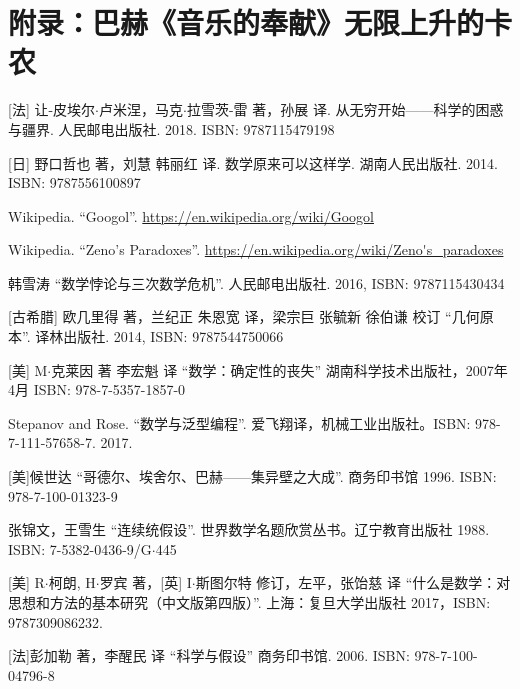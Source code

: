\documentclass{article}
\begin{document}

\section{附录：巴赫《音乐的奉献》无限上升的卡农}



\ifx\wholebook\relax \else
\begin{thebibliography}{99}

[法] 让-皮埃尔$\cdot$卢米涅，马克$\cdot$拉雪茨-雷 著，孙展 译. 从无穷开始——科学的困惑与疆界. 人民邮电出版社. 2018. ISBN: 9787115479198

[日] 野口哲也 著，刘慧 韩丽红 译. 数学原来可以这样学. 湖南人民出版社. 2014. ISBN: 9787556100897

Wikipedia. ``Googol''. \url{https://en.wikipedia.org/wiki/Googol}

Wikipedia. ``Zeno's Paradoxes''. \url{https://en.wikipedia.org/wiki/Zeno's_paradoxes}

韩雪涛 ``数学悖论与三次数学危机''. 人民邮电出版社. 2016, ISBN: 9787115430434

[古希腊] 欧几里得 著，兰纪正 朱恩宽 译，梁宗巨 张毓新 徐伯谦 校订 ``几何原本''. 译林出版社. 2014, ISBN: 9787544750066

[美] M$\cdot$克莱因 著 李宏魁 译 ``数学：确定性的丧失'' 湖南科学技术出版社，2007年4月 ISBN: 978-7-5357-1857-0

Stepanov and Rose. ``数学与泛型编程''. 爱飞翔译，机械工业出版社。ISBN: 978-7-111-57658-7. 2017.

[美]候世达 ``哥德尔、埃舍尔、巴赫——集异壁之大成''. 商务印书馆 1996. ISBN: 978-7-100-01323-9

张锦文，王雪生 ``连续统假设''. 世界数学名题欣赏丛书。辽宁教育出版社 1988. ISBN: 7-5382-0436-9/G$\cdot$445

[美] R$\cdot$柯朗, H$\cdot$罗宾 著，[英] I$\cdot$斯图尔特 修订，左平，张饴慈 译 ``什么是数学：对思想和方法的基本研究（中文版第四版）''. 上海：复旦大学出版社 2017，ISBN: 9787309086232.


[法]彭加勒 著，李醒民 译 ``科学与假设'' 商务印书馆. 2006. ISBN: 978-7-100-04796-8

\end{thebibliography}

\expandafter\enddocument

\fi
\end{document}
